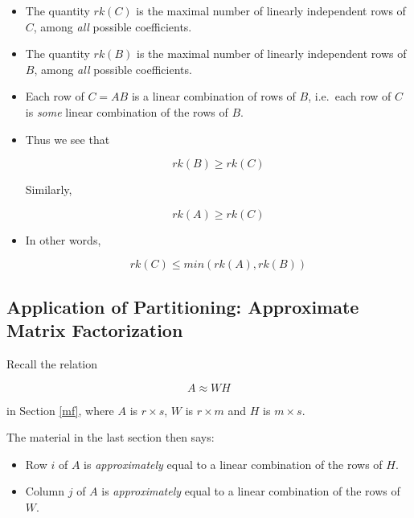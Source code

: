 \begin{itemize}

\item The quantity $rk(C)$ is the maximal number of linearly independent
rows of $C$, among \textit{all} possible coefficients.

\item The quantity $rk(B)$ is the maximal number of linearly independent
rows of $B$, among \textit{all} possible coefficients.

\item Each row of $C = AB$ is a linear combination of rows of $B$,
i.e.\ each row of $C$ is \textit{some} linear combination of the rows of
$B$.

\item Thus we see that 

\begin{equation}
rk(B) \geq rk(C)
\end{equation}

Similarly,

\begin{equation}
rk(A) \geq rk(C)
\end{equation}

\item In other words,

\begin{equation}
rk(C) \leq min(rk(A),rk(B))
\end{equation}

\end{itemize} 

\subsection{Application of Partitioning:  Approximate Matrix Factorization}
\label{mfact}

Recall the relation 

\begin{equation}
A \approx WH
\end{equation}

in Section \ref{mf}, where $A$ is $r \times s$, $W$ is $r \times m$ and
$H$ is $m \times s$.  

The material in the last section then says:

\begin{itemize}

\item Row $i$ of $A$ is \textit{approximately} equal to a linear
combination of the rows of $H$.

\item Column $j$ of $A$ is \textit{approximately} equal to a linear
combination of the rows of $W$.

\end{itemize} 

